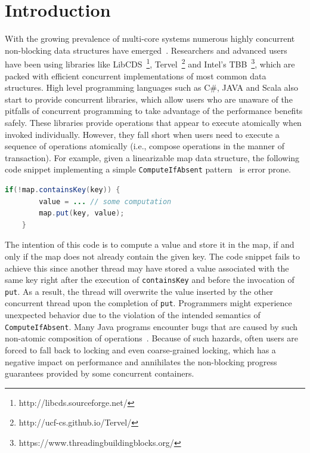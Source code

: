 \documentclass[10pt,conference,compsocconf]{IEEEtran}
\begin{document}
\section{Introduction}
\label{sec:intro}
With the growing prevalence of multi-core systems numerous highly concurrent non-blocking data structures have emerged~\cite{linden2013skiplist,ellen2010non,braginsky2012lock,zhang2015lockfree,michael2002high}.
Researchers and advanced users have been using libraries like LibCDS~\footnote{http://libcds.sourceforge.net/}, Tervel~\footnote{http://ucf-cs.github.io/Tervel/} and Intel's TBB~\footnote{https://www.threadingbuildingblocks.org/}, which are packed with efficient concurrent implementations of most common data structures.
High level programming languages such as C\#, JAVA and Scala also start to provide concurrent libraries, which allow users who are unaware of the pitfalls of concurrent programming to take advantage of the performance benefits safely.
These libraries provide operations that appear to execute atomically when invoked individually.
However, they fall short when users need to execute a sequence of operations atomically (i.e., compose operations in the manner of transaction).
For example, given a linearizable map data structure, the following code snippet implementing a simple \texttt{ComputeIfAbsent} pattern~\cite{golan2013concurrent} is error prone.
\begin{lstlisting}[basicstyle=\small,language=JAVA]
    if(!map.containsKey(key)) {
        value = ... // some computation
        map.put(key, value);
    }
\end{lstlisting}
The intention of this code is to compute a value and store it in the map, if and only if the map does not already contain the given key.
The code snippet fails to achieve this since another thread may have stored a value associated with the same key right after the execution of \texttt{containsKey} and before the invocation of \texttt{put}.
As a result, the thread will overwrite the value inserted by the other concurrent thread upon the completion of \texttt{put}.
Programmers might experience unexpected behavior due to the violation of the intended semantics of \texttt{ComputeIfAbsent}.
Many Java programs encounter bugs that are caused by such non-atomic composition of operations~\cite{shacham2011testing}.
Because of such hazards, often users are forced to fall back to locking and even coarse-grained locking, which has a negative impact on performance and annihilates the non-blocking progress guarantees provided by some concurrent containers.
\end{document}
